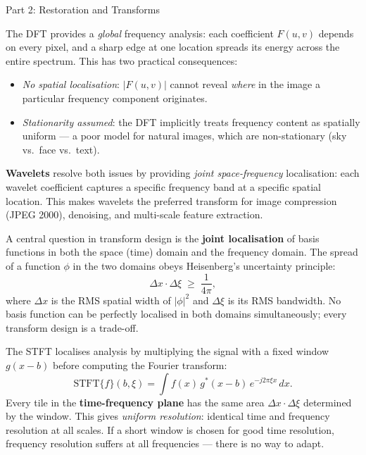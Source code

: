 \documentclass[letterpaper]{article}
\begin{document}
\begin{notes}{Part 2: Restoration and Transforms}

The DFT provides a \emph{global} frequency analysis: each coefficient $F(u,v)$ depends on every pixel, and a sharp edge at one location spreads its energy across the entire spectrum. This has two practical consequences:

\begin{itemize}
    \item \textit{No spatial localisation}: $|F(u,v)|$ cannot reveal \emph{where} in the image a particular frequency component originates.
    \item \textit{Stationarity assumed}: the DFT implicitly treats frequency content as spatially uniform — a poor model for natural images, which are non-stationary (sky vs.\ face vs.\ text).
\end{itemize}

\textbf{Wavelets} resolve both issues by providing \emph{joint space-frequency} localisation: each wavelet coefficient captures a specific frequency band at a specific spatial location. This makes wavelets the preferred transform for image compression (JPEG 2000), denoising, and multi-scale feature extraction.


A central question in transform design is the \textbf{joint localisation} of basis functions in both the space (time) domain and the frequency domain. The spread of a function $\phi$ in the two domains obeys Heisenberg's uncertainty principle:
$$\Delta x \cdot \Delta\xi \;\geq\; \frac{1}{4\pi},$$
where $\Delta x$ is the RMS spatial width of $|\phi|^2$ and $\Delta\xi$ is its RMS bandwidth. No basis function can be perfectly localised in both domains simultaneously; every transform design is a trade-off.


The STFT localises analysis by multiplying the signal with a fixed window $g(x-b)$ before computing the Fourier transform:
$$\mathrm{STFT}\{f\}(b,\xi) = \int f(x)\,g^*(x-b)\,e^{-j2\pi\xi x}\,dx.$$
Every tile in the \textbf{time-frequency plane} has the same area $\Delta x \cdot \Delta\xi$ determined by the window. This gives \emph{uniform resolution}: identical time and frequency resolution at all scales. If a short window is chosen for good time resolution, frequency resolution suffers at all frequencies — there is no way to adapt.



\end{notes}
\end{document}
